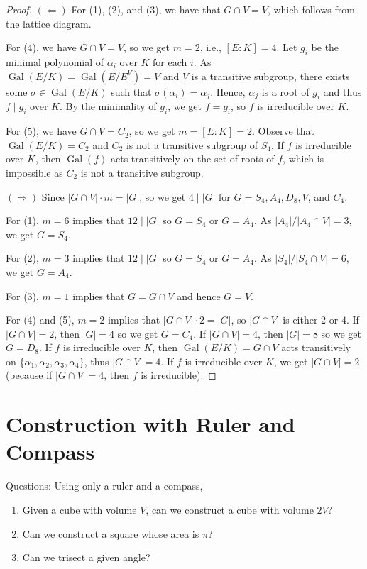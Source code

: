 \documentclass[twoside]{article}
\DeclareMathOperator\Gal{Gal}
\theoremstyle{remark}
\begin{document}
\begin{proof}
  \((\Leftarrow)\) For (1), (2), and (3), we have that \(G\cap V = V\), which follows from the lattice diagram. \par
  For (4),  we have \(G\cap V = V\), so we get \(m=2\), i.e., \([E:K]=4\). Let \(g_i\) be the minimal polynomial of \(\alpha_i\) over \(K\) for each \(i\). As \(\Gal(E/K) = \Gal(E/E^V) = V\) and \(V\) is a transitive subgroup, there exists some \(\sigma \in \Gal(E/K)\) such that \(\sigma(\alpha_i) = \alpha_j\). Hence, \(\alpha_j\) is a root of \(g_i\) and thus \(f \mid g_i\) over \(K\). By the minimality of \(g_i\), we get \(f=g_i\), so \(f\) is irreducible over \(K\). \par
  For (5), we have \(G\cap V = C_2\), so we get \(m = [E:K] = 2\). Observe that \(\Gal(E/K) = C_2\) and \(C_2\) is not a transitive subgroup of \(S_4\). If \(f\) is irreducible over \(K\), then \(\Gal(f)\) acts transitively on the set of roots of \(f\), which is impossible as \(C_2\) is not a transitive subgroup.
  
  \((\Rightarrow)\) Since \(|G\cap V| \cdot m = |G|\), so we get \(4 \mid |G|\) for \(G = S_4, A_4, D_8, V\), and \(C_4\). \par
  For (1), \(m=6\) implies that \(12 \mid |G|\) so \(G = S_4\) or \(G = A_4\). As \(|A_4|/|A_4 \cap V| = 3\), we get \(G = S_4\). \par
  For (2), \(m=3\) implies that \(12 \mid |G|\) so \(G = S_4\) or \(G = A_4\). As \(|S_4|/|S_4 \cap V| = 6\), we get \(G = A_4\). \par
  For (3), \(m=1\) implies that \(G = G \cap V\) and hence \(G = V\). \par
  For (4) and (5), \(m=2\) implies that \(|G \cap V| \cdot 2 = |G|\), so \(|G \cap V|\) is either \(2\) or \(4\). If \(|G \cap V| = 2\), then \(|G| = 4\) so we get \(G = C_4\). If \(|G \cap V| = 4\), then \(|G| = 8\) so we get \(G = D_8\). If \(f\) is irreducible over \(K\), then \(\Gal(E/K) = G \cap V\) acts transitively on \(\{\alpha_1,\alpha_2,\alpha_3,\alpha_4\}\), thus \(|G \cap V| = 4\). If \(f\) is irreducible over \(K\), we get \(|G \cap V| = 2\) (because if \(|G \cap V| = 4\), then \(f\) is irreducible).
\end{proof}


\section{Construction with Ruler and Compass}

Questions: Using only a ruler and a compass,
\begin{enumerate}[label=(\arabic*),nosep]
  \item Given a cube with volume \(V\), can we construct a cube with volume \(2V\)?
  \item Can we construct a square whose area is \(\pi\)?
  \item Can we trisect a given angle?
\end{enumerate}
\end{document}

